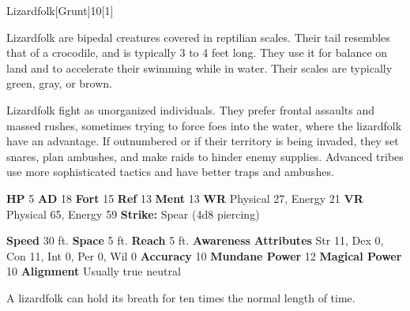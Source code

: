   \begin{monsection}{Lizardfolk}[Grunt]{10}[1]
    \vspace{-1em}\vspace{-1em}
    \vspace{0em}

    
    Lizardfolk are bipedal creatures covered in reptilian scales.
    Their tail resembles that of a crocodile, and is typically 3 to 4 feet long.
    They use it for balance on land and to accelerate their swimming while in water.
    Their scales are typically green, gray, or brown.

    Lizardfolk fight as unorganized individuals.
    They prefer frontal assaults and massed rushes, sometimes trying to force foes into the water, where the lizardfolk have an advantage.
    If outnumbered or if their territory is being invaded, they set snares, plan ambushes, and make raids to hinder enemy supplies.
    Advanced tribes use more sophisticated tactics and have better traps and ambushes.
  
    

    \begin{spellcontent}
      \begin{spelltargetinginfo}
        \pari \textbf{HP} 5 \monsep
          \textbf{AD} 18 \monsep
          \textbf{Fort} 15 \monsep
          \textbf{Ref} 13 \monsep
          \textbf{Ment} 13
        \pari \textbf{WR} Physical 27, Energy 21 \monsep
        \textbf{VR} Physical 65, Energy 59
        \pari \textbf{Strike:}
            Spear  (4d8 piercing)
      \end{spelltargetinginfo}
    \end{spellcontent}
    \begin{monsterfooter}
      \pari \textbf{Speed} 30 ft. \monsep
        \textbf{Space} 5 ft. \monsep
        \textbf{Reach} 5 ft.
      \pari \textbf{Awareness} 
      \pari \textbf{Attributes}
        Str 11, Dex 0,
        Con 11, Int 0,
        Per 0, Wil 0
      \pari \textbf{Accuracy} 10 \monsep
        \textbf{Mundane Power} 12 \monsep
      \textbf{Magical Power} 10
      \pari \textbf{Alignment} Usually true neutral
    \end{monsterfooter}
  \end{monsection}
   A lizardfolk can hold its breath for ten times the normal length of time.
  
